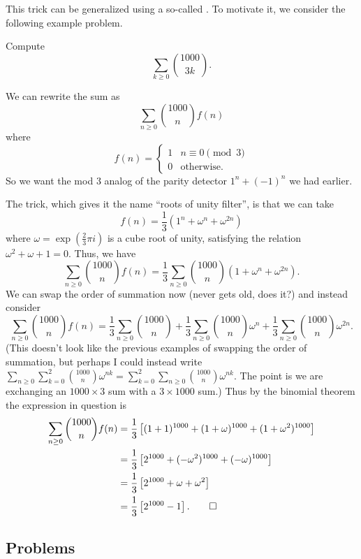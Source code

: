 \documentclass[11pt]{scrartcl}
\begin{document}
This trick can be generalized using a so-called .
To motivate it, we consider the following example problem.
\begin{example}
	Compute 
	\[ \sum_{k \ge 0} \binom{1000}{3k}. \]
\end{example}
\begin{soln}
	We can rewrite the sum as
	\[ \sum_{n \ge 0} \binom{1000}{n} f(n) \]
	where
	\[ f(n) = \begin{cases}
			1 & n \equiv 0 \pmod 3 \\
			0 & \text{otherwise}.
		\end{cases} \]
	So we want the mod $3$ analog of the parity detector $1^n + (-1)^n$ we had earlier.

	The trick, which gives it the name ``roots of unity filter'',
	is that we can take
	\[ f(n) = \frac{1}{3} \left( 1^n + \omega^n + \omega^{2n} \right) \]
	where $\omega = \exp\left( \frac23\pi i \right)$ is a cube root of unity,
	satisfying the relation $\omega^2 + \omega + 1 = 0$.
	Thus, we have
	\[
		\sum_{n \ge 0} \binom{1000}{n} f(n)
		= \frac13 \sum_{n \ge 0} \binom{1000}{n} (1+\omega^{n}+\omega^{2n}).
	\]
	We can swap the order of summation now
	(never gets old, does it?)
	and instead consider
	\[
		\sum_{n \ge 0} \binom{1000}{n} f(n)
		= \frac13 \sum_{n \ge 0} \binom{1000}{n}
		+ \frac13 \sum_{n \ge 0} \binom{1000}{n} \omega^n
		+ \frac13 \sum_{n \ge 0} \binom{1000}{n} \omega^{2n}.
	\]
	(This doesn't look like the previous examples of swapping the order
	of summation, but perhaps I could instead write
	$\sum_{n \ge 0} \sum_{k=0}^2 \binom{1000}{n} \omega^{nk}
	= \sum_{k=0}^2 \sum_{n \ge 0} \binom{1000}{n} \omega^{nk}$.
	The point is we are exchanging an $1000 \times 3$ sum
	with a $3 \times 1000$ sum.)
	Thus by the binomial theorem the expression in question is
	\begin{align*}
		\sum_{n \ge 0} \binom{1000}{n} f(n) &= \frac13
		\left[ (1+1)^{1000} + (1+\omega)^{1000} + (1+\omega^2)^{1000} \right] \\
		&= \frac13
		\left[ 2^{1000} + (-\omega^2)^{1000} + (-\omega)^{1000} \right] \\
		&= \frac13 
		\left[ 2^{1000} + \omega + \omega^2 \right] \\
		&= \frac13 \left[ 2^{1000} - 1 \right]. \qedhere
	\end{align*}
\end{soln}

\subsection{Problems}
\end{document}
